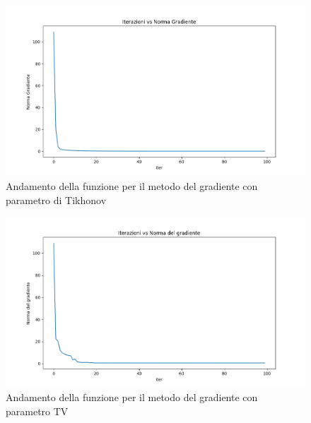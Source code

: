 \documentclass[12pt]{article}
\begin{document}
    \begin{figure}[h!]
    \centering
    \includegraphics[width=15cm]{norma}
    \caption{Andamento della funzione per il metodo del gradiente con parametro di Tikhonov}
    \label{graph:1}
    \end{figure}
    
    \begin{figure}[h!]
    \centering
    \includegraphics[width=15cm]{norma_totvar}
    \caption{Andamento della funzione per il metodo del gradiente con parametro TV}
    \label{graph:2}
    \end{figure}

    
\end{document}
